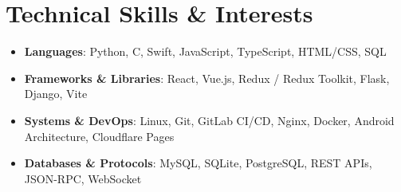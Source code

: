 \documentclass[10pt,letterpaper]{article}
\begin{document}
\section{Technical Skills \& Interests}
\begin{itemize}
  \item \textbf{Languages}: Python, C, Swift, JavaScript, TypeScript, HTML/CSS, SQL
  \item \textbf{Frameworks \& Libraries}: React, Vue.js, Redux / Redux Toolkit, Flask, Django, Vite
  \item \textbf{Systems \& DevOps}: Linux, Git, GitLab CI/CD, Nginx, Docker, Android Architecture, Cloudflare Pages
  \item \textbf{Databases \& Protocols}: MySQL, SQLite, PostgreSQL, REST APIs, JSON-RPC, WebSocket
\end{itemize}\vspace{2pt}
\end{document}

